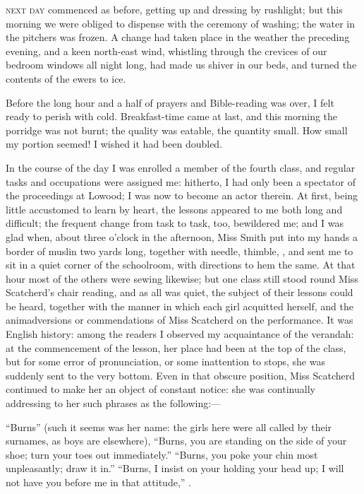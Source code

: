 
 \textsc{next day} commenced as before, getting up and dressing by rushlight;
but this morning we were obliged to dispense with the ceremony of
washing; the water in the pitchers was frozen.  A change had taken place
in the weather the preceding evening, and a keen north-east wind,
whistling through the crevices of our bedroom windows all night long,
had made us shiver in our beds, and turned the contents of the ewers to
ice.

Before the long hour and a half of prayers and Bible-reading was over, I
felt ready to perish with cold.  Breakfast-time came at last, and this
morning the porridge was not burnt; the quality was eatable, the
quantity small.  How small my portion seemed!  I wished it had been
doubled.

In the course of the day I was enrolled a member of the fourth class,
and regular tasks and occupations were assigned me: hitherto, I had only
been a spectator of the proceedings at Lowood; I was now to become an
actor therein.  At first, being little accustomed to learn by heart, the
lessons appeared to me both long and difficult; the frequent change from
task to task, too, bewildered me; and I was glad when, about three
o'clock in the afternoon, Miss Smith put into my hands a border of
muslin two yards long, together with needle, thimble, \etc, and sent me
to sit in a quiet corner of the schoolroom, with directions to hem the
same.  At that hour most of the others were sewing likewise; but one
class still stood round Miss Scatcherd's chair reading, and as all was
quiet, the subject of their lessons could be heard, together with the
manner in which each girl acquitted herself, and the animadversions or
commendations of Miss Scatcherd on the performance.  It was English
history: among the readers I observed my acquaintance of the verandah:
at the commencement of the lesson, her place had been at the top of the
class, but for some error of pronunciation, or some inattention to
stops, she was suddenly sent to the very bottom.  Even in that obscure
position, Miss Scatcherd continued to make her an object of constant
notice: she was continually addressing to her such phrases as the
following:---

\enquote{Burns} (such it seems was her name: the girls here were all
called by their surnames, as boys are elsewhere), \enquote{Burns, you
	are standing on the side of your shoe; turn your toes out immediately.}
\enquote{Burns, you poke your chin most unpleasantly; draw it in.}
\enquote{Burns, I insist on your holding your head up; I will not have
	you before me in that attitude,} \etc{} \etc.

